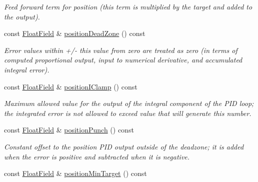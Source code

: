 \begin{DoxyCompactItemize}
\begin{DoxyCompactList}\small\item\em Feed forward term for position (this term is multiplied by the target and added to the output). \end{DoxyCompactList}\item 
const \hyperlink{classhebi_1_1Info_1_1FloatField}{Float\+Field} \& \hyperlink{classhebi_1_1Info_1_1Settings_1_1Actuator_1_1PositionGains_ad162aa430d29de587d371c104a5cb1c5}{position\+Dead\+Zone} () const \hypertarget{classhebi_1_1Info_1_1Settings_1_1Actuator_1_1PositionGains_ad162aa430d29de587d371c104a5cb1c5}{}\label{classhebi_1_1Info_1_1Settings_1_1Actuator_1_1PositionGains_ad162aa430d29de587d371c104a5cb1c5}

\begin{DoxyCompactList}\small\item\em Error values within +/-\/ this value from zero are treated as zero (in terms of computed proportional output, input to numerical derivative, and accumulated integral error). \end{DoxyCompactList}\item 
const \hyperlink{classhebi_1_1Info_1_1FloatField}{Float\+Field} \& \hyperlink{classhebi_1_1Info_1_1Settings_1_1Actuator_1_1PositionGains_aeccce98f468fa9475de9888594c66ebe}{position\+I\+Clamp} () const \hypertarget{classhebi_1_1Info_1_1Settings_1_1Actuator_1_1PositionGains_aeccce98f468fa9475de9888594c66ebe}{}\label{classhebi_1_1Info_1_1Settings_1_1Actuator_1_1PositionGains_aeccce98f468fa9475de9888594c66ebe}

\begin{DoxyCompactList}\small\item\em Maximum allowed value for the output of the integral component of the P\+ID loop; the integrated error is not allowed to exceed value that will generate this number. \end{DoxyCompactList}\item 
const \hyperlink{classhebi_1_1Info_1_1FloatField}{Float\+Field} \& \hyperlink{classhebi_1_1Info_1_1Settings_1_1Actuator_1_1PositionGains_aa05349afa351c6ff222bff27f1c0af8d}{position\+Punch} () const \hypertarget{classhebi_1_1Info_1_1Settings_1_1Actuator_1_1PositionGains_aa05349afa351c6ff222bff27f1c0af8d}{}\label{classhebi_1_1Info_1_1Settings_1_1Actuator_1_1PositionGains_aa05349afa351c6ff222bff27f1c0af8d}

\begin{DoxyCompactList}\small\item\em Constant offset to the position P\+ID output outside of the deadzone; it is added when the error is positive and subtracted when it is negative. \end{DoxyCompactList}\item 
const \hyperlink{classhebi_1_1Info_1_1FloatField}{Float\+Field} \& \hyperlink{classhebi_1_1Info_1_1Settings_1_1Actuator_1_1PositionGains_a1e9df7f4d6d63658d599e65a2598bbe8}{position\+Min\+Target} () const \hypertarget{classhebi_1_1Info_1_1Settings_1_1Actuator_1_1PositionGains_a1e9df7f4d6d63658d599e65a2598bbe8}{}\label{classhebi_1_1Info_1_1Settings_1_1Actuator_1_1PositionGains_a1e9df7f4d6d63658d599e65a2598bbe8}


\end{DoxyCompactItemize}
